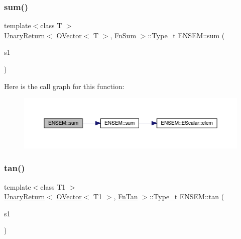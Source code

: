 \subsubsection{\texorpdfstring{sum()}{sum()}}
{\footnotesize\ttfamily template$<$class T $>$ \\
\mbox{\hyperlink{structENSEM_1_1UnaryReturn}{Unary\+Return}}$<$ \mbox{\hyperlink{classENSEM_1_1OVector}{O\+Vector}}$<$ T $>$, \mbox{\hyperlink{structENSEM_1_1FnSum}{Fn\+Sum}} $>$\+::Type\+\_\+t E\+N\+S\+E\+M\+::sum (\begin{DoxyParamCaption}\item[{const \mbox{\hyperlink{classENSEM_1_1OVector}{O\+Vector}}$<$ T $>$ \&}]{s1 }\end{DoxyParamCaption})\hspace{0.3cm}{\ttfamily [inline]}}

Here is the call graph for this function\+:\nopagebreak
\begin{figure}[H]
\begin{center}
\leavevmode
\includegraphics[width=350pt]{da/d59/group__obsvector_gaea84ad793fea0a58204b33a7bcee51b4_cgraph}
\end{center}
\end{figure}
\mbox{\label{group__obsvector_gaf380b1c371f0b85fa8b4f4e207fa15de}} 
\subsubsection{\texorpdfstring{tan()}{tan()}}
{\footnotesize\ttfamily template$<$class T1 $>$ \\
\mbox{\hyperlink{structENSEM_1_1UnaryReturn}{Unary\+Return}}$<$ \mbox{\hyperlink{classENSEM_1_1OVector}{O\+Vector}}$<$ T1 $>$, \mbox{\hyperlink{structENSEM_1_1FnTan}{Fn\+Tan}} $>$\+::Type\+\_\+t E\+N\+S\+E\+M\+::tan (\begin{DoxyParamCaption}\item[{const \mbox{\hyperlink{classENSEM_1_1OVector}{O\+Vector}}$<$ T1 $>$ \&}]{s1 }\end{DoxyParamCaption})\hspace{0.3cm}{\ttfamily [inline]}}

